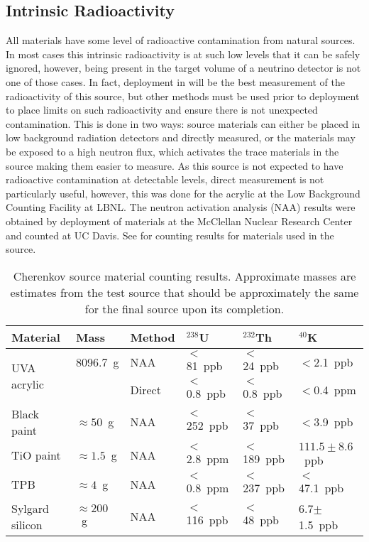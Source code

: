 \subsection{Intrinsic Radioactivity}
\label{sec:matcounting}
All materials have some level of radioactive contamination from natural sources.
In most cases this intrinsic radioactivity is at such low levels that it can be safely ignored, however, being present in the target volume of a neutrino detector is not one of those cases.
In fact, deployment in {\snop} will be the best measurement of the radioactivity of this source, but other methods must be used prior to deployment to place limits on such radioactivity and ensure there is not unexpected contamination.
This is done in two ways: source materials can either be placed in low background radiation detectors and directly measured, or the materials may be exposed to a high neutron flux, which activates the trace materials in the source making them easier to measure.
As this source is not expected to have radioactive contamination at detectable levels, direct measurement is not particularly useful, however, this was done for the acrylic at the Low Background Counting Facility at LBNL.
The neutron activation analysis (NAA) results were obtained by deployment of materials at the McClellan Nuclear Research Center and counted at UC Davis. 
See  for counting results for materials used in the source.

\begin{table}[h!]
\centering
\begin{tabular}{|l|l|l|l|l|l|} \hline
                    Material       & Mass & Method    & $^{238}$U     & $^{232}$Th    & $^{40}$K      \\ \hline
 \multirow{2}{*}{UVA acrylic}  & 8096.7~g & NAA    & $<$81~ppb    & $<$24~ppb   & $<$2.1~ppb   \\ \cline{3-6}
                                   & & Direct & $<$0.8~ppb &$<$0.8~ppb & $<$0.4~ppm \\ \hline
                    Black paint    & $\approx 50$~g & NAA    & $<$252~ppb   & $<$37~ppb   & $<$3.9~ppb           \\ \hline
                    TiO paint      & $\approx 1.5$~g & NAA    & $<$2.8~ppm   & $<$189~ppb  & $111.5 \pm 8.6$~ppb           \\ \hline
                    TPB            & $\approx 4$~g & NAA    & $<$0.8~ppm   & $<$237~ppb   & $<$47.1~ppb  \\ \hline
                    Sylgard silicon& $\approx 200$~g & NAA    & $<$116~ppb   & $<$48~ppb   &6.7$\pm$1.5~ppb\\ \hline
\end{tabular}
\caption{\label{tab:counting} Cherenkov source material counting results. Approximate masses are estimates from the test source that should be approximately the same for the final source upon its completion.}
\end{table}

